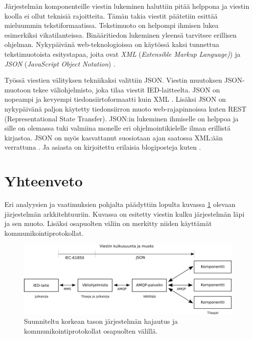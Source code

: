 Järjestelmän komponenteille viestin lukeminen haluttiin pitää helppona ja viestin koolla ei ollut teknisiä rajoitteita. Tämän takia viestit päätetiin esittää mieluummin tekstiformaatissa. Tekstimuoto on helpompi ihmisen lukea esimerkiksi vikatilanteissa. Binääritiedon lukeminen yleensä tarvitsee erillisen ohjelman. Nykypäivänä web-teknologioissa on käytössä kaksi tunnettua tekstimuotoista esitystapaa, joita ovat \emph{XML} (\emph{Extensible Markup Language)}) \cite{xml-specification} ja \emph{JSON} (\emph{JavaScript Object Notation}) \cite{json-standard}.

Työssä viestien välityksen tekniikaksi valittiin JSON. Viestin muutoksen JSON-muotoon tekee väliohjelmisto, joka tilaa viestit IED-laitteelta. JSON on nopeampi ja kevyempi tiedonsiirtoformaatti kuin XML \cite{json-xml-comparison}. Lisäksi JSON on nykypäivänä paljon käytetty tiedonsiirron muoto web-rajapinnoissa kuten REST (Representational State Transfer). JSON:in lukeminen ihmiselle on helppoa ja sille on olemassa tuki valmiina monelle eri ohjelmointikielelle ilman erillistä kirjastoa. JSON on myös kasvattanut suosiotaan ajan saatossa XML:ään verrattuna \cite{google-trends-xml-json}. Ja asiasta on kirjoitettu erilaisia blogiposteja kuten \cite{the-rise-and-rise-of-json, why-json-is-better-than-xml, Patrizio2016}.


\section{Yhteenveto}
Eri analyysien ja vaatimuksien pohjalta päädyttiin lopulta kuvassa \ref{fig:high-level-system-architecture} olevaan järjestelmän arkkitehtuuriin. Kuvassa on esitetty viestin kulku järjestelmän läpi ja sen muoto. Lisäksi osapuolten väliin on merkitty niiden käyttämät kommunikointiprotokollat.

\begin{figure}[ht!]
	\includegraphics[width=1\textwidth]{pictures/high-level-system-architecture.png}
	\caption{Suunniteltu korkean tason järjestelmän hajautus ja kommunikointiprotokollat osapuolten välillä.}
	\label{fig:high-level-system-architecture}
\end{figure}

